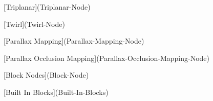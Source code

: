 \begin{DoxyItemize}
\begin{DoxyItemize}
\begin{DoxyItemize}
\item \mbox{[}Triplanar\mbox{]}(Triplanar-\/\+Node)
\item \mbox{[}Twirl\mbox{]}(Twirl-\/\+Node)
\item \mbox{[}Parallax Mapping\mbox{]}(Parallax-\/\+Mapping-\/\+Node)
\item \mbox{[}Parallax Occlusion Mapping\mbox{]}(Parallax-\/\+Occlusion-\/\+Mapping-\/\+Node)
\end{DoxyItemize}
\item \mbox{[}Block Nodes\mbox{]}(Block-\/\+Node)
\begin{DoxyItemize}
\item \mbox{[}Built In Blocks\mbox{]}(Built-\/\+In-\/\+Blocks) 
\end{DoxyItemize}
\end{DoxyItemize}
\end{DoxyItemize}